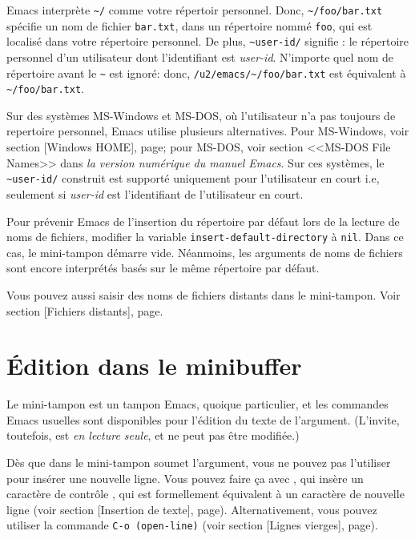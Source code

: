 Emacs interprète \texttt{\textasciitilde/} comme votre répertoir
personnel. Donc, \texttt{\textasciitilde/foo/bar.txt} spécifie un nom
de fichier \texttt{bar.txt}, dans un répertoire nommé \texttt{foo},
qui est localisé dans votre répertoire personnel. De plus,
\texttt{\textasciitilde user-id/} signifie : le répertoire personnel
d'un utilisateur dont l'identifiant est \emph{user-id}. N'importe quel
nom de répertoire avant le \texttt{\textasciitilde} est ignoré: donc,
\texttt{/u2/emacs/\textasciitilde/foo/bar.txt} est équivalent à
\texttt{\textasciitilde/foo/bar.txt}.\par 

Sur des systèmes MS-Windows et MS-DOS, où l'utilisateur n'a pas
toujours de repertoire personnel, Emacs utilise plusieurs
alternatives. Pour MS-Windows, voir section [Windows
HOME], page; pour MS-DOS, voir section <<MS-DOS File
Names>> dans \emph{la version numérique du manuel Emacs}. Sur ces
systèmes, le \texttt{\textasciitilde user-id/} construit est supporté
uniquement pour l'utilisateur en court i.e, seulement si
\emph{user-id} est l'identifiant de l'utilisateur en court.\par

Pour prévenir Emacs de l'insertion du répertoire par défaut lors de la
lecture de noms de fichiers, modifier la variable
\texttt{insert-default-directory} à \texttt{nil}. Dans ce cas, le
mini-tampon démarre vide. Néanmoins, les arguments de noms de fichiers
sont encore interprétés basés sur le même répertoire par défaut.\par

Vous pouvez aussi saisir des noms de fichiers distants dans le
mini-tampon. Voir section [Fichiers distants],
page.\par 

\section{\'Edition dans le minibuffer}

Le mini-tampon est un tampon Emacs, quoique particulier, et les
commandes Emacs usuelles sont disponibles pour l'édition du texte de
l'argument. (L'invite, toutefois, est \emph{en lecture seule}, et ne
peut pas être modifiée.)\par 

Dès que \RET dans le mini-tampon soumet l'argument, vous ne
pouvez pas l'utiliser pour insérer une nouvelle ligne. Vous pouvez
faire ça avec , qui insère un caractère de contrôle
, qui est formellement équivalent à un caractère de
nouvelle ligne (voir section [Insertion de texte],
page). Alternativement, vous pouvez utiliser la commande
\texttt{C-o (open-line)} (voir section [Lignes vierges],
page). \par

